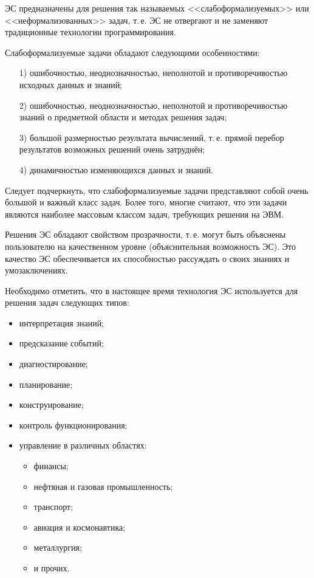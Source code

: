 ЭС предназначены для решения так называемых <<слабоформализуемых>> или
<<неформализованных>> задач, т.\,е. ЭС не отвергают и не заменяют
традиционные технологии программирования.

Слабоформализуемые задачи обладают следующими особенностями:
\begin{enumerate}
\item[1)] ошибочностью, неоднозначностью, неполнотой и
  противоречивостью исходных данных и знаний;
\item[2)] ошибочностью, неоднозначностью, неполнотой и
  противоречивостью знаний о предметной области и методах решения
  задач;
\item[3)] большой размерностью результата вычислений, т.\,е. прямой
  перебор результатов возможных решений очень затруднён;
\item[4)] динамичностью изменяющихся данных и знаний.
\end{enumerate}

\begin{rem}
  Следует подчеркнуть, что слабоформализуемые задачи представляют
  собой очень большой и важный класс задач. Более того, многие
  считают, что эти задачи являются наиболее массовым классом задач,
  требующих решения на ЭВМ.
\end{rem}

Решения ЭС обладают свойством прозрачности, т.\,е. могут быть
объяснены пользователю на качественном уровне (объяснительная
возможность ЭС). Это качество ЭС обеспечивается их способностью
рассуждать о своих знаниях и умозаключениях.

Необходимо отметить, что в настоящее время технология ЭС используется
для решения задач следующих типов:
\begin{itemize}
\item интерпретация знаний;
\item предсказание событий;
\item диагностирование;
\item планирование;
\item конструирование;
\item контроль функционирования;
\item управление в различных областях:
  \begin{itemize}
  \item финансы;
  \item нефтяная и газовая промышленность;
  \item транспорт;
  \item авиация и космонавтика;
  \item металлургия;
  \item и прочих.
  \end{itemize}
\end{itemize}

